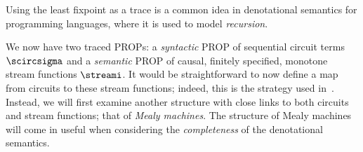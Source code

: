 \begin{remark}
    Using the least fixpoint as a trace is a common idea in
    denotational semantics for programming languages, where it is used to
    model \emph{recursion}.
\end{remark}

We now have two traced PROPs: a \emph{syntactic} PROP of sequential circuit
terms \(\scircsigma\) and a \emph{semantic} PROP of causal, finitely
specified, monotone stream functions \(\streami\).
It would be straightforward to now define a map from circuits to these stream
functions; indeed, this is the strategy used in~\cite{ghica2024fully}.
Instead, we will first examine another structure with close links to both
circuits and stream functions; that of \emph{Mealy machines}.
The structure of Mealy machines will come in useful when considering the
\emph{completeness} of the denotational semantics.